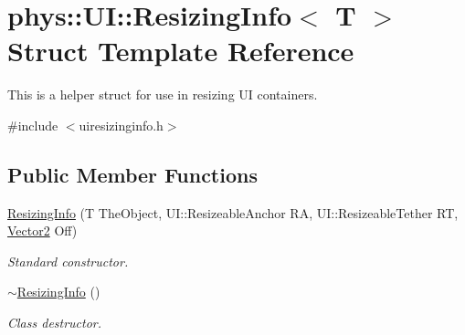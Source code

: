 \hypertarget{structphys_1_1UI_1_1ResizingInfo}{
\section{phys::UI::ResizingInfo$<$ T $>$ Struct Template Reference}
\label{d0/d08/structphys_1_1UI_1_1ResizingInfo}
}


This is a helper struct for use in resizing UI containers.  




{\ttfamily \#include $<$uiresizinginfo.h$>$}

\subsection*{Public Member Functions}
\begin{DoxyCompactItemize}
\item 
\hyperlink{structphys_1_1UI_1_1ResizingInfo_a38e0e636eaa33da1516d29d5dacad5b7}{ResizingInfo} (T TheObject, UI::ResizeableAnchor RA, UI::ResizeableTether RT, \hyperlink{classphys_1_1Vector2}{Vector2} Off)
\begin{DoxyCompactList}\small\item\em Standard constructor. \item\end{DoxyCompactList}\item 
\hypertarget{structphys_1_1UI_1_1ResizingInfo_a4443b66121aff4be05676e11a1bbe987}{
\hyperlink{structphys_1_1UI_1_1ResizingInfo_a4443b66121aff4be05676e11a1bbe987}{$\sim$ResizingInfo} ()}
\label{d0/d08/structphys_1_1UI_1_1ResizingInfo_a4443b66121aff4be05676e11a1bbe987}

\begin{DoxyCompactList}\small\item\em Class destructor. \item\end{DoxyCompactList}\end{DoxyCompactItemize}
